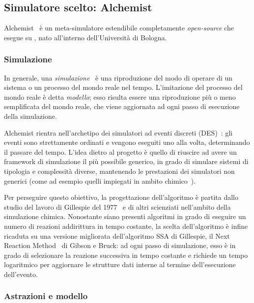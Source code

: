 \subsection{Simulatore scelto: Alchemist}\label{subsec:alchemist}
  Alchemist~\cite{alchemist-jos2013} è un meta-simulatore estendibile completamente \emph{open-source} che esegue su , nato all'interno dell'Università di Bologna.

  \subsubsection{Simulazione}\label{subsec:introAlchemist}
    In generale, una \emph{simulazione}~\cite{des3} è una riproduzione del modo di operare di un sistema o un processo del mondo reale nel tempo.
    L'imitazione del processo del mondo reale è detta \emph{modello};
    esso risulta essere una riproduzione più o meno semplificata del mondo reale, che viene aggiornata ad ogni passo di esecuzione della simulazione.

    Alchemist rientra nell'archetipo dei simulatori ad eventi discreti (DES)~\cite{des, des2}:
    gli eventi sono strettamente ordinati e vengono eseguiti uno alla volta, determinando il passare del tempo.
    L'idea dietro al progetto è quello di riuscire ad avere un framework di simulazione il più possibile generico, in grado di simulare sistemi di tipologia e complessità diverse, mantenendo le prestazioni dei simulatori non generici (come ad esempio quelli impiegati in ambito chimico~\cite{gillespie1976}).

    Per perseguire questo obiettivo, la progettazione dell'algoritmo è partita dallo studio del lavoro di Gillespie del 1977~\cite{gillespie1977} e di altri scienziati nell'ambito della simulazione chimica.
    Nonostante siano presenti algoritmi in grado di eseguire un numero di reazioni addirittura in tempo costante, la scelta dell'algoritmo è infine ricaduta su una versione migliorata dell'algoritmo SSA di Gillespie, il Next Reaction Method~\cite{nextReactionMethod} di Gibson e Bruck:
    ad ogni passo di simulazione, esso è in grado di selezionare la reazione successiva in tempo costante e richiede un tempo logaritmico per aggiornare le strutture dati interne al termine dell'esecuzione dell'evento.

  \subsubsection{Astrazioni e modello}\label{subsec:modello}

